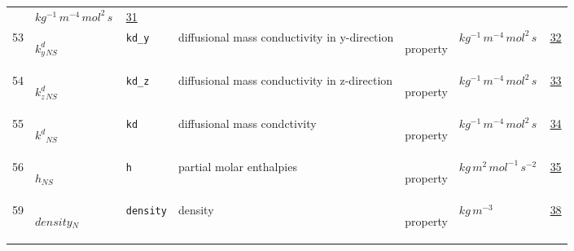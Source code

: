 \begin{longtable}{|p{1cm}|p{2.5cm}|p{4.5cm}|p{8cm}|p{3.0cm}|p{3cm}|p{1cm}|}
             & $ kg^{-1} \,m^{-4} \,mol^{2} \,s \, $
             & \hyperlink{"e:31"}{ 31 }
                 \\
    53
             & \hypertarget{"v:53"}{ $ {{k^d_y}}{_{{N S}}} $}
             & \verb|kd_y|
             & diffusional mass conductivity in y-direction
             & \begin{lay}property \end{lay}
             & $ kg^{-1} \,m^{-4} \,mol^{2} \,s \, $
             & \hyperlink{"e:32"}{ 32 }
                 \\
    54
             & \hypertarget{"v:54"}{ $ {{k^d_z}}{_{{N S}}} $}
             & \verb|kd_z|
             & diffusional mass conductivity in z-direction
             & \begin{lay}property \end{lay}
             & $ kg^{-1} \,m^{-4} \,mol^{2} \,s \, $
             & \hyperlink{"e:33"}{ 33 }
                 \\
    55
             & \hypertarget{"v:55"}{ $ {{k^d}}{_{{N S}}} $}
             & \verb|kd|
             & diffusional mass condctivity
             & \begin{lay}property \end{lay}
             & $ kg^{-1} \,m^{-4} \,mol^{2} \,s \, $
             & \hyperlink{"e:34"}{ 34 }
                 \\
    56
             & \hypertarget{"v:56"}{ $ {h}{_{{N S}}} $}
             & \verb|h|
             & partial molar enthalpies
             & \begin{lay}property \end{lay}
             & $ kg \,m^{2} \,mol^{-1} \,s^{-2} \, $
             & \hyperlink{"e:35"}{ 35 }
                 \\
    59
             & \hypertarget{"v:59"}{ $ {density}{_{N}} $}
             & \verb|density|
             & density
             & \begin{lay}property \end{lay}
             & $ kg \,m^{-3} \, $
             & \hyperlink{"e:38"}{ 38 }
                 \\
    \end{longtable}